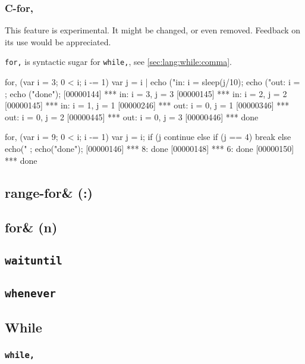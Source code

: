 \subsubsection{C-for,}
\begin{note}
  This feature is experimental.  It might be changed, or even removed.
  Feedback on its use would be appreciated.
\end{note}

\lstinline|for,| is syntactic sugar for \lstinline|while,|, see
\autoref{sec:lang:while:comma}.

\begin{urbiscript}[firstnumber=last]
for, (var i = 3; 0 < i; i -= 1)
{
  var j = i |
  echo ("in: i = %
  sleep(j/10);
  echo ("out: i = %
};
echo ("done");
[00000144] *** in: i = 3, j = 3
[00000145] *** in: i = 2, j = 2
[00000145] *** in: i = 1, j = 1
[00000246] *** out: i = 0, j = 1
[00000346] *** out: i = 0, j = 2
[00000445] *** out: i = 0, j = 3
[00000446] *** done
\end{urbiscript}

\begin{urbiscript}[firstnumber=last]
for, (var i = 9; 0 < i; i -= 1)
{
  var j = i;
  if (j %
    continue
  else if (j == 4)
    break
  else
    echo("%
};
echo("done");
[00000146] *** 8: done
[00000148] *** 6: done
[00000150] *** done
\end{urbiscript}


\subsection{range-for\& (:)}
\subsection{for\& (n)}
\subsection{\lstinline|waituntil|}
\subsection{\lstinline|whenever|}

\subsection{While}
\subsubsection{\lstinline|while,|}
\label{sec:lang:while:comma}


